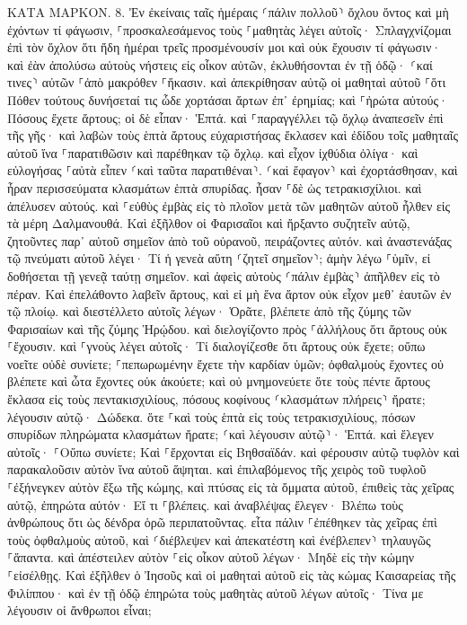 \documentclass[twoside, 9pt]{extreport}
\begin{document}
ΚΑΤΑ ΜΑΡΚΟΝ.
8.
Ἐν ἐκείναις ταῖς ἡμέραις ⸂πάλιν πολλοῦ⸃ ὄχλου ὄντος καὶ μὴ ἐχόντων τί φάγωσιν, ⸀προσκαλεσάμενος τοὺς ⸀μαθητὰς λέγει αὐτοῖς· 
Σπλαγχνίζομαι ἐπὶ τὸν ὄχλον ὅτι ἤδη ἡμέραι τρεῖς προσμένουσίν μοι καὶ οὐκ ἔχουσιν τί φάγωσιν· 
καὶ ἐὰν ἀπολύσω αὐτοὺς νήστεις εἰς οἶκον αὐτῶν, ἐκλυθήσονται ἐν τῇ ὁδῷ· ⸂καί τινες⸃ αὐτῶν ⸀ἀπὸ μακρόθεν ⸀ἥκασιν. 
καὶ ἀπεκρίθησαν αὐτῷ οἱ μαθηταὶ αὐτοῦ ⸀ὅτι Πόθεν τούτους δυνήσεταί τις ὧδε χορτάσαι ἄρτων ἐπ᾽ ἐρημίας; 
καὶ ⸀ἠρώτα αὐτούς· Πόσους ἔχετε ἄρτους; οἱ δὲ εἶπαν· Ἑπτά. 
καὶ ⸀παραγγέλλει τῷ ὄχλῳ ἀναπεσεῖν ἐπὶ τῆς γῆς· καὶ λαβὼν τοὺς ἑπτὰ ἄρτους εὐχαριστήσας ἔκλασεν καὶ ἐδίδου τοῖς μαθηταῖς αὐτοῦ ἵνα ⸀παρατιθῶσιν καὶ παρέθηκαν τῷ ὄχλῳ. 
καὶ εἶχον ἰχθύδια ὀλίγα· καὶ εὐλογήσας ⸀αὐτὰ εἶπεν ⸂καὶ ταῦτα παρατιθέναι⸃. 
⸂καὶ ἔφαγον⸃ καὶ ἐχορτάσθησαν, καὶ ἦραν περισσεύματα κλασμάτων ἑπτὰ σπυρίδας. 
ἦσαν ⸀δὲ ὡς τετρακισχίλιοι. καὶ ἀπέλυσεν αὐτούς. 
καὶ ⸀εὐθὺς ἐμβὰς εἰς τὸ πλοῖον μετὰ τῶν μαθητῶν αὐτοῦ ἦλθεν εἰς τὰ μέρη Δαλμανουθά. 
Καὶ ἐξῆλθον οἱ Φαρισαῖοι καὶ ἤρξαντο συζητεῖν αὐτῷ, ζητοῦντες παρ᾽ αὐτοῦ σημεῖον ἀπὸ τοῦ οὐρανοῦ, πειράζοντες αὐτόν. 
καὶ ἀναστενάξας τῷ πνεύματι αὐτοῦ λέγει· Τί ἡ γενεὰ αὕτη ⸂ζητεῖ σημεῖον⸃; ἀμὴν λέγω ⸀ὑμῖν, εἰ δοθήσεται τῇ γενεᾷ ταύτῃ σημεῖον. 
καὶ ἀφεὶς αὐτοὺς ⸂πάλιν ἐμβὰς⸃ ἀπῆλθεν εἰς τὸ πέραν. 
Καὶ ἐπελάθοντο λαβεῖν ἄρτους, καὶ εἰ μὴ ἕνα ἄρτον οὐκ εἶχον μεθ᾽ ἑαυτῶν ἐν τῷ πλοίῳ. 
καὶ διεστέλλετο αὐτοῖς λέγων· Ὁρᾶτε, βλέπετε ἀπὸ τῆς ζύμης τῶν Φαρισαίων καὶ τῆς ζύμης Ἡρῴδου. 
καὶ διελογίζοντο πρὸς ⸀ἀλλήλους ὅτι ἄρτους οὐκ ⸀ἔχουσιν. 
καὶ ⸀γνοὺς λέγει αὐτοῖς· Τί διαλογίζεσθε ὅτι ἄρτους οὐκ ἔχετε; οὔπω νοεῖτε οὐδὲ συνίετε; ⸀πεπωρωμένην ἔχετε τὴν καρδίαν ὑμῶν; 
ὀφθαλμοὺς ἔχοντες οὐ βλέπετε καὶ ὦτα ἔχοντες οὐκ ἀκούετε; καὶ οὐ μνημονεύετε 
ὅτε τοὺς πέντε ἄρτους ἔκλασα εἰς τοὺς πεντακισχιλίους, πόσους κοφίνους ⸂κλασμάτων πλήρεις⸃ ἤρατε; λέγουσιν αὐτῷ· Δώδεκα. 
ὅτε ⸀καὶ τοὺς ἑπτὰ εἰς τοὺς τετρακισχιλίους, πόσων σπυρίδων πληρώματα κλασμάτων ἤρατε; ⸂καὶ λέγουσιν αὐτῷ⸃· Ἑπτά. 
καὶ ἔλεγεν αὐτοῖς· ⸀Οὔπω συνίετε; 
Καὶ ⸀ἔρχονται εἰς Βηθσαϊδάν. καὶ φέρουσιν αὐτῷ τυφλὸν καὶ παρακαλοῦσιν αὐτὸν ἵνα αὐτοῦ ἅψηται. 
καὶ ἐπιλαβόμενος τῆς χειρὸς τοῦ τυφλοῦ ⸀ἐξήνεγκεν αὐτὸν ἔξω τῆς κώμης, καὶ πτύσας εἰς τὰ ὄμματα αὐτοῦ, ἐπιθεὶς τὰς χεῖρας αὐτῷ, ἐπηρώτα αὐτόν· Εἴ τι ⸀βλέπεις. 
καὶ ἀναβλέψας ἔλεγεν· Βλέπω τοὺς ἀνθρώπους ὅτι ὡς δένδρα ὁρῶ περιπατοῦντας. 
εἶτα πάλιν ⸀ἐπέθηκεν τὰς χεῖρας ἐπὶ τοὺς ὀφθαλμοὺς αὐτοῦ, καὶ ⸂διέβλεψεν καὶ ἀπεκατέστη καὶ ἐνέβλεπεν⸃ τηλαυγῶς ⸀ἅπαντα. 
καὶ ἀπέστειλεν αὐτὸν ⸀εἰς οἶκον αὐτοῦ λέγων· Μηδὲ εἰς τὴν κώμην ⸀εἰσέλθῃς. 
Καὶ ἐξῆλθεν ὁ Ἰησοῦς καὶ οἱ μαθηταὶ αὐτοῦ εἰς τὰς κώμας Καισαρείας τῆς Φιλίππου· καὶ ἐν τῇ ὁδῷ ἐπηρώτα τοὺς μαθητὰς αὐτοῦ λέγων αὐτοῖς· Τίνα με λέγουσιν οἱ ἄνθρωποι εἶναι; 
\end{document}
